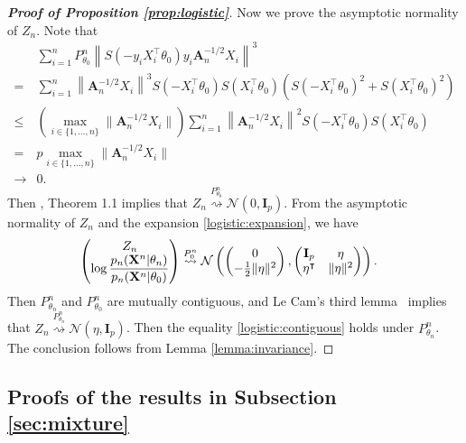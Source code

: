 \documentclass[11pt]{article}
\newcommand{\BA}{\mathbf{A}}    \newcommand{\BB}{\mathbf{B}}    \newcommand{\BC}{\mathbf{C}}    \newcommand{\BD}{\mathbf{D}}    \newcommand{\BE}{\mathbf{E}}    \newcommand{\BF}{\mathbf{F}}    \newcommand{\BG}{\mathbf{G}}    \newcommand{\BH}{\mathbf{H}}    \newcommand{\BI}{\mathbf{I}}    \newcommand{\BJ}{\mathbf{J}}    \newcommand{\BK}{\mathbf{K}}    \newcommand{\BL}{\mathbf{L}}
\newcommand{\myT}{\intercal}
\theoremstyle{plain}
\theoremstyle{definition}
\theoremstyle{remark}
\begin{document}
\begin{appendices}
\begin{proof}[\textbf{Proof of Proposition \ref{prop:logistic}}]
Now we prove the asymptotic normality of $Z_n$.
Note that
\begin{align*}
    &
    \sum_{i=1}^n
    P_{\theta_0}^n
 \left\|
 S(-y_i X_i^\myT \theta_0)  
 y_i
 \BA_n^{-1/2}
 X_i
 \right\|^3
 \\
=&
    \sum_{i=1}^n
 \left\|
 \BA_n^{-1/2}
 X_i
 \right\|^3
 S(- X_i^\myT \theta_0)
 S(X_i^\myT \theta_0)
 \left(
 S(- X_i^\myT \theta_0)^2
 +
 S(X_i^\myT \theta_0)^2
\right)
 \\
 \leq&
 \left(
     \max_{i\in \{1,\dots,n\}}
 \|\BA_n^{-1/2}
 X_i\|
 \right)
    \sum_{i=1}^n
 \left\|
 \BA_n^{-1/2}
 X_i
 \right\|^2
 S(- X_i^\myT \theta_0)
 S(X_i^\myT \theta_0)
 \\
 =&
 p
     \max_{i\in \{1,\dots,n\}}
 \|\BA_n^{-1/2}
 X_i\|
 \\
 \to & 0
 .
\end{align*}
Then
\cite{Raic2019A}, Theorem 1.1 implies that
$Z_n \overset{P^n_{\theta_0}}{\rightsquigarrow} \mathcal N (0, \BI_p) $.
From the asymptotic normality of $Z_n$ and the expansion \eqref{logistic:expansion}, we have
\begin{align*}
    \left(
    \begin{matrix}
        \displaystyle
        Z_n
        \\
        \displaystyle
        \log \frac{p_n(\BX^{n}|\theta_n)}{p_n(\BX^{n}|\theta_0)}
    \end{matrix}
    \right)
    &\overset{P_0^n}{\rightsquigarrow}
    \mathcal{N}\left(
    \left(
    \begin{matrix}
        0\\
        -\frac{1}{2}\|\eta\|^2
    \end{matrix}
    \right),
    \left(
        \begin{matrix}
            \BI_p & \eta\\
            \eta^\myT  & \|\eta\|^2
        \end{matrix}
    \right)
    \right).
\end{align*}
Then
$P^n_{\theta_n}$ and $P^n_{\theta_0}$ are mutually contiguous, and Le Cam's third lemma~\citep[Example 6.7]{van2000asymptotic} implies that
$Z_n\overset{P^n_{\theta_n}}{\rightsquigarrow} \mathcal{N}(\eta , \BI_p)$.
Then the equality \eqref{logistic:contiguous} holds under $P_{\theta_n}^n$.
The conclusion follows from Lemma \ref{lemma:invariance}.
\end{proof}




\subsection{Proofs of the results in Subsection \ref{sec:mixture}}


\end{appendices}
\end{document}

